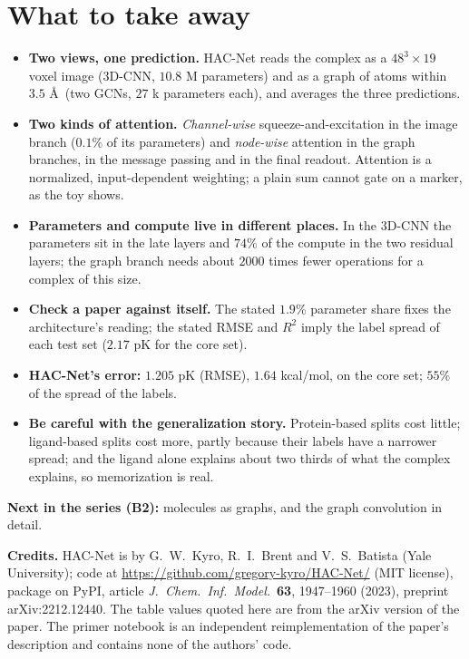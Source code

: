 \documentclass[11pt]{article}
\begin{document}
\section{What to take away}
\begin{keybox}[Summary]
\begin{itemize}[nosep]
  \item \textbf{Two views, one prediction.} HAC-Net reads the complex as a $48^3\times19$ voxel image (3D-CNN, $10.8$ M parameters) and as a graph of atoms within $3.5$ \AA\ (two GCNs, $27$ k parameters each), and averages the three predictions.
  \item \textbf{Two kinds of attention.} \emph{Channel-wise} squeeze-and-excitation in the image branch ($0.1\%$ of its parameters) and \emph{node-wise} attention in the graph branches, in the message passing and in the final readout. Attention is a normalized, input-dependent weighting; a plain sum cannot gate on a marker, as the toy shows.
  \item \textbf{Parameters and compute live in different places.} In the 3D-CNN the parameters sit in the late layers and $74\%$ of the compute in the two residual layers; the graph branch needs about $2000$ times fewer operations for a complex of this size.
  \item \textbf{Check a paper against itself.} The stated $1.9\%$ parameter share fixes the architecture's reading; the stated RMSE and $R^2$ imply the label spread of each test set ($2.17$ pK for the core set).
  \item \textbf{HAC-Net's error:} $1.205$ pK (RMSE), $1.64$ kcal/mol, on the core set; $55\%$ of the spread of the labels.
  \item \textbf{Be careful with the generalization story.} Protein-based splits cost little; ligand-based splits cost more, partly because their labels have a narrower spread; and the ligand alone explains about two thirds of what the complex explains, so memorization is real.
\end{itemize}
\end{keybox}

\textbf{Next in the series (B2):} molecules as graphs, and the graph convolution in detail.

\vspace{0.5em}
{\footnotesize\textbf{Credits.} HAC-Net is by G.~W.~Kyro, R.~I.~Brent and V.~S.~Batista (Yale University); code at \url{https://github.com/gregory-kyro/HAC-Net/} (MIT license), package on PyPI, article \emph{J.\ Chem.\ Inf.\ Model.}\ \textbf{63}, 1947--1960 (2023), preprint arXiv:2212.12440. The table values quoted here are from the arXiv version of the paper. The primer notebook is an independent reimplementation of the paper's description and contains none of the authors' code.}
\end{document}
